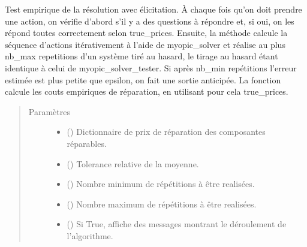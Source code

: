 \documentclass[letterpaper,10pt,french]{sphinxmanual}
\begin{document}
\begin{fulllineitems}
\begin{fulllineitems}
\label{\detokenize{index:DecisionTheoreticTroubleshooting.TroubleShootingProblem.elicitation_solver_tester}}
Test empirique de la résolution avec élicitation. À chaque fois qu’on
doit prendre une action, on vérifie d’abord s’il y a des questions à
répondre et, si oui, on les répond toutes correctement selon
true\_prices. Ensuite, la méthode calcule la séquence d’actions
itérativement à l’aide de myopic\_solver et réalise au plus nb\_max
repetitions d’un système tiré au hasard, le tirage au hasard étant
identique à celui de myopic\_solver\_tester. Si après nb\_min repétitions
l’erreur estimée est plus petite que epsilon, on fait une sortie
anticipée. La fonction calcule les couts empiriques de réparation, en
utilisant pour cela true\_prices.
\begin{quote}\begin{description}
\item[{Paramètres}] \leavevmode\begin{itemize}
\item {} 
 () \textendash{} Dictionnaire de prix de réparation des composantes réparables.

\item {} 
 () \textendash{} Tolerance relative de la moyenne.

\item {} 
 () \textendash{} Nombre minimum de répétitions à être realisées.

\item {} 
 () \textendash{} Nombre maximum de répétitions à être realisées.

\item {} 
 (\sphinxstyleliteralemphasis{\sphinxupquote{, }}) \textendash{} Si True, affiche des messages montrant le déroulement de
l’algorithme.


\end{itemize}
\end{description}
\end{quote}
\end{fulllineitems}
\end{fulllineitems}
\end{document}
